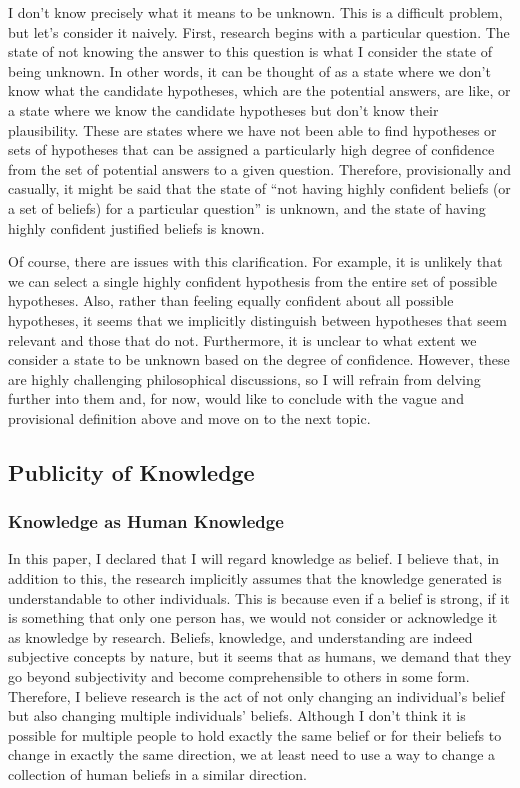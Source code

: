 \documentclass{book}
\begin{document}
I don't know precisely what it means to be unknown. This is a difficult problem, but let's consider it naively. First, research begins with a particular question. The state of not knowing the answer to this question is what I consider the state of being unknown. In other words, it can be thought of as a state where we don't know what the candidate hypotheses, which are the potential answers, are like, or a state where we know the candidate hypotheses but don't know their plausibility. These are states where we have not been able to find hypotheses or sets of hypotheses that can be assigned a particularly high degree of confidence from the set of potential answers to a given question. Therefore, provisionally and casually, it might be said that the state of ``not having highly confident beliefs (or a set of beliefs) for a particular question'' is unknown, and the state of having highly confident justified beliefs is known.

Of course, there are issues with this clarification. For example, it is unlikely that we can select a single highly confident hypothesis from the entire set of possible hypotheses. Also, rather than feeling equally confident about all possible hypotheses, it seems that we implicitly distinguish between hypotheses that seem relevant and those that do not. Furthermore, it is unclear to what extent we consider a state to be unknown based on the degree of confidence. However, these are highly challenging philosophical discussions, so I will refrain from delving further into them and, for now, would like to conclude with the vague and provisional definition above and move on to the next topic.

\subsection{Publicity of Knowledge}
\subsubsection{Knowledge as Human Knowledge}
In this paper, I declared that I will regard knowledge as belief. I believe that, in addition to this, the research implicitly assumes that the knowledge generated is understandable to other individuals. This is because even if a belief is strong, if it is something that only one person has, we would not consider or acknowledge it as knowledge by research. Beliefs, knowledge, and understanding are indeed subjective concepts by nature, but it seems that as humans, we demand that they go beyond subjectivity and become comprehensible to others in some form. Therefore, I believe research is the act of not only changing an individual's belief but also changing multiple individuals' beliefs. Although I don't think it is possible for multiple people to hold exactly the same belief or for their beliefs to change in exactly the same direction, we at least need to use a way to change a collection of human beliefs in a similar direction.
\end{document}
